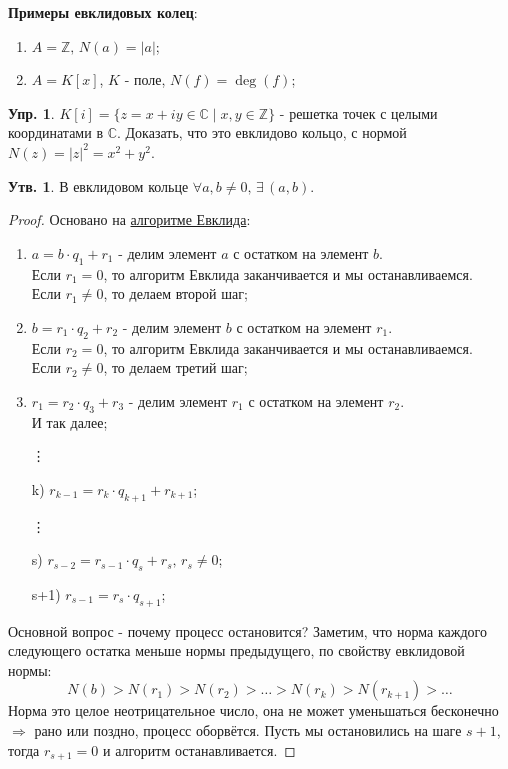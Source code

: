 \documentclass[12pt]{article}
\newcommand{\MC}{\mathbb{C}}
\newcommand{\MZ}{\mathbb{Z}}
\theoremstyle{definition}
\newtheorem{prop}{Утв.}
\newtheorem{exrc}{Упр.}
\begin{document}
\textbf{Примеры евклидовых колец}:
\begin{enumerate}[label=\arabic*)]
	\item $A = \MZ, \, N(a) = |a|$;
	\item $A = K[x]$, $K$ - поле, $N(f) = \deg(f)$;
\end{enumerate}
\begin{exrc}
	 $K[i] = \{z = x + iy \in \MC \mid x,y \in \MZ\}$ - решетка точек с целыми координатами в $\MC$. Доказать, что это евклидово кольцо, с нормой $N(z) = |z|^2 = x^2 + y^2$. 
\end{exrc}
\begin{prop}
	В евклидовом кольце $\forall a,b \neq 0, \, \exists \, (a,b)$.
\end{prop}
\begin{proof}
	Основано на \uline{алгоритме Евклида}: 
	\begin{enumerate}[label =(\arabic*)]
		\item $a = b{\cdot}q_1 + r_1$ - делим элемент $a$ с остатком на элемент $b$.\\
		Если $r_1 = 0$, то алгоритм Евклида заканчивается и мы останавливаемся. \\
		Если $r_1 \neq 0$, то делаем второй шаг;
		\item $b = r_1{\cdot}q_2 + r_2$ - делим элемент $b$ с остатком на элемент $r_1$.\\
		Если $r_2 = 0$, то алгоритм Евклида заканчивается и мы останавливаемся. \\
		Если $r_2 \neq 0$, то делаем третий шаг;
		\item $r_1 = r_2{\cdot}q_3 + r_3$ - делим элемент $r_1$ с остатком на элемент $r_2$.\\
		И так далее;
		\item[\vdots]
		\item[k)] $r_{k-1} = r_k{\cdot}q_{k+1} + r_{k+1}$;
		\item[\vdots]
		\item[s)] $r_{s-2} = r_{s-1}{\cdot}q_s + r_s, \, r_s \neq 0$;
		\item[s+1)] $r_{s-1} = r_s{\cdot}q_{s+1}$;
	\end{enumerate}
	Основной вопрос - почему процесс остановится? Заметим, что норма каждого следующего остатка меньше нормы предыдущего, по свойству евклидовой нормы:
	$$
		N(b) > N(r_1) > N(r_2) > \dotsc > N(r_k) > N(r_{k+1}) > \dotsc
	$$
	Норма это целое неотрицательное число, она не может уменьшаться бесконечно $\Rightarrow$ рано или поздно, процесс оборвётся. Пусть мы остановились на шаге $s+1$, тогда $r_{s+1} = 0$ и алгоритм останавливается.
	 

\end{proof}
\end{document}

